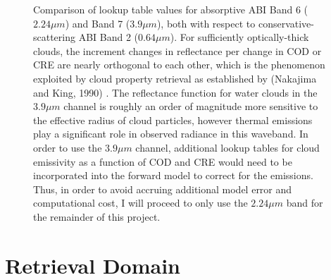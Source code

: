 \documentclass[12pt]{article}
\begin{document}
\begin{figure}[h!]
\begin{center}
    \end{center}
    \caption{Comparison of lookup table values for absorptive ABI Band 6 ($2.24\mu m$) and Band 7 ($3.9\mu m$), both with respect to conservative-scattering ABI Band 2 ($0.64\mu m$). For sufficiently optically-thick clouds, the increment changes in reflectance per change in COD or CRE are nearly orthogonal to each other, which is the phenomenon exploited by cloud property retrieval as established by (Nakajima and King, 1990) \cite{nakajima_determination_1990}. The reflectance function for water clouds in the $3.9\mu m$ channel is roughly an order of magnitude more sensitive to the effective radius of cloud particles, however thermal emissions play a significant role in observed radiance in this waveband. In order to use the $3.9\mu m$ channel, additional lookup tables for cloud emissivity as a function of COD and CRE would need to be incorporated into the forward model to correct for the emissions. Thus, in order to avoid accruing additional model error and computational cost, I will proceed to only use the $2.24\mu m$ band for the remainder of this project.}
    \label{b6b7_bispec}
\end{figure}

\vspace{-1em}

\section{Retrieval Domain}

\vspace{-2em}
\end{document}
